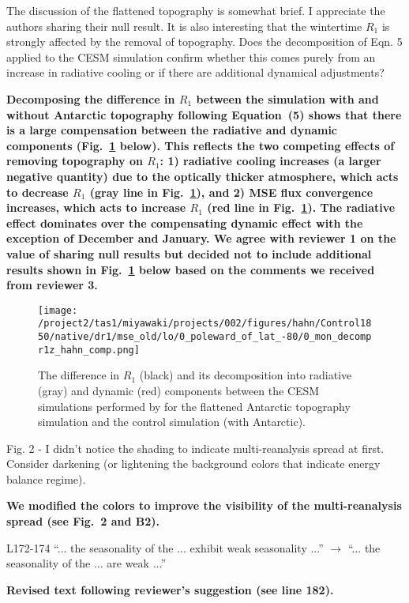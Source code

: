 \documentclass{article}
\begin{document}
The discussion of the flattened topography is somewhat brief. I appreciate the authors sharing their null result. It is also interesting that the wintertime $R_1$ is strongly affected by the removal of topography. Does the decomposition of Eqn. 5 applied to the CESM simulation confirm whether this comes purely from an increase in radiative cooling or if there are additional dynamical adjustments?

\textbf{Decomposing the difference in $R_1$ between the simulation with and without Antarctic topography following Equation~(5) shows that there is a large compensation between the radiative and dynamic components (Fig.~\ref{fig:hahn-decomp} below). This reflects the two competing effects of removing topography on $R_1$: 1) radiative cooling increases (a larger negative quantity) due to the optically thicker atmosphere, which acts to decrease $R_1$ (gray line in Fig.~\ref{fig:hahn-decomp}), and 2) MSE flux convergence increases, which acts to increase $R_1$ (red line in Fig.~\ref{fig:hahn-decomp}). The radiative effect dominates over the compensating dynamic effect with the exception of December and January. We agree with reviewer 1 on the value of sharing null results but decided not to include additional results shown in Fig.~\ref{fig:hahn-decomp} below based on the comments we received from reviewer 3.}

\begin{figure}[!h]
  \noindent\texttt{[image: /project2/tas1/miyawaki/projects/002/figures/hahn/Control1850/native/dr1/mse\_old/lo/0\_poleward\_of\_lat\_-80/0\_mon\_decompr1z\_hahn\_comp.png]}
  \caption{The difference in $R_1$ (black) and its decomposition into radiative (gray) and dynamic (red) components between the CESM simulations performed by \citep{hahn2020} for the flattened Antarctic topography simulation and the control simulation (with Antarctic).}
  \label{fig:hahn-decomp}
\end{figure}

Fig. 2 - I didn't notice the shading to indicate multi-reanalysis spread at first. Consider darkening (or lightening the background colors that indicate energy balance regime).

\textbf{We modified the colors to improve the visibility of the multi-reanalysis spread (see Fig.~2 and B2).}

L172-174 ``... the seasonality of the ... exhibit weak seasonality ...'' $\rightarrow$ ``... the seasonality of the ... are weak ...''

\textbf{Revised text following reviewer's suggestion (see line 182).}
\end{document}

